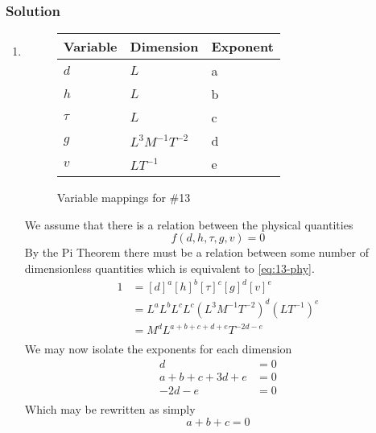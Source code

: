 \documentclass[12pt]{article}
\begin{document}
  \subsubsection*{Solution}
  \begin{enumerate}
  \item
    \begin{figure}
      \centering
      \begin{tabularx}{0.5\textwidth}{XXX}
        Variable & Dimension & Exponent \\ \midrule
        $d$ & $L$ & a \\
        $h$ & $L$ & b \\
        $\tau$ & $L$ & c \\
        $g$ & $L^3M^{-1}T^{-2}$ & d \\
        $v$ & $LT^{-1}$ & e \\
      \end{tabularx}
      \caption{Variable mappings for \#13}
\label{fig:13-var-mappings}
    \end{figure}
    We assume that there is a relation between the physical quantities
    \begin{equation}
      \label{eq:13-phy}
      f(d,h,\tau,g,v) = 0
    \end{equation}
    By the Pi Theorem there must be a relation between some number of
    dimensionless quantities which is equivalent to \cref{eq:13-phy}.
    \begin{equation*}
      \begin{aligned}
        1 &= {[d]}^a {[h]}^b {[\tau]}^c {[g]}^d {[v]}^e \\
        &= L^{a}L^{b}L^{c}L^{c}{(L^3M^{-1}T^{-2})}^{d}{(LT^{-1})}^{e} \\
        &= M^{d}L^{a+b+c+d+e}T^{-2d-e} \\
      \end{aligned}
    \end{equation*}
    We may now isolate the exponents for each dimension
    \begin{equation*}
      \begin{aligned}
        d &= 0 \\
        a + b + c + 3d + e &= 0 \\
        -2d - e &= 0 \\
      \end{aligned}
    \end{equation*}
    Which may be rewritten as simply
    \begin{equation*}
      a + b + c = 0

\end{equation*}
\end{enumerate}
\end{document}
